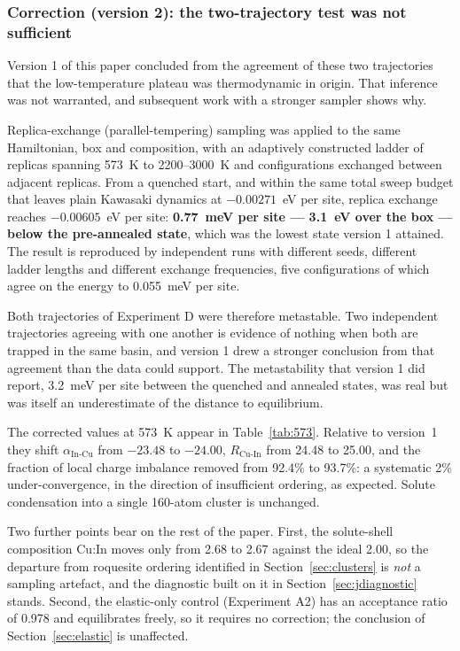 \documentclass[11pt,a4paper]{article}
\newcommand{\aInCu}{\alpha_{\mathrm{In\text{-}Cu}}}
\newcommand{\RCuIn}{R_{\mathrm{Cu\text{-}In}}}
\begin{document}
\subsubsection*{Correction (version 2): the two-trajectory test was not
sufficient}

Version 1 of this paper concluded from the agreement of these two trajectories
that the low-temperature plateau was thermodynamic in origin. That inference was
not warranted, and subsequent work with a stronger sampler shows why.

Replica-exchange (parallel-tempering) sampling was applied to the same
Hamiltonian, box and composition, with an adaptively constructed ladder of
replicas spanning 573~K to 2200--3000~K and configurations exchanged between
adjacent replicas. From a quenched start, and within the same total sweep budget
that leaves plain Kawasaki dynamics at $-0.00271$~eV per site, replica exchange
reaches $-0.00605$~eV per site: \textbf{0.77~meV per site --- 3.1~eV over the
box --- below the pre-annealed state}, which was the lowest state version 1
attained. The result is reproduced by independent runs with different seeds,
different ladder lengths and different exchange frequencies, five configurations
of which agree on the energy to 0.055~meV per site.

Both trajectories of Experiment D were therefore metastable. Two independent
trajectories agreeing with one another is evidence of nothing when both are
trapped in the same basin, and version 1 drew a stronger conclusion from that
agreement than the data could support. The metastability that version 1 did
report, 3.2~meV per site between the quenched and annealed states, was real but
was itself an underestimate of the distance to equilibrium.

The corrected values at 573~K appear in Table~\ref{tab:573}. Relative to
version~1 they shift $\aInCu$ from $-23.48$ to $-24.00$, $\RCuIn$ from 24.48 to
25.00, and the fraction of local charge imbalance removed from 92.4\% to
93.7\%: a systematic 2\% under-convergence, in the direction of insufficient
ordering, as expected. Solute condensation into a single 160-atom cluster is
unchanged.

Two further points bear on the rest of the paper. First, the solute-shell
composition Cu:In moves only from 2.68 to 2.67 against the ideal 2.00, so the
departure from roquesite ordering identified in Section~\ref{sec:clusters} is
\emph{not} a sampling artefact, and the diagnostic built on it in
Section~\ref{sec:jdiagnostic} stands. Second, the elastic-only control
(Experiment A2) has an acceptance ratio of 0.978 and equilibrates freely, so it
requires no correction; the conclusion of Section~\ref{sec:elastic} is
unaffected.
\end{document}
